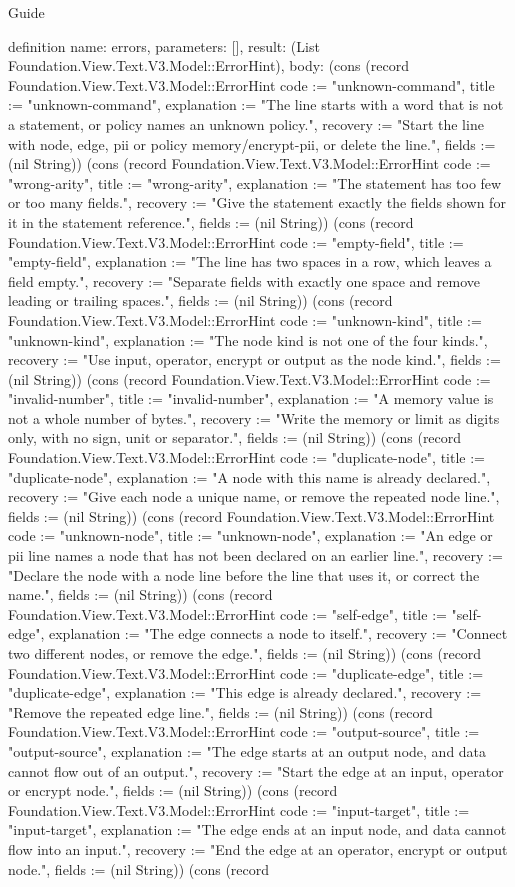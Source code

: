 \begin{lexlean}{Guide}
\begin{semanticmodule}
definition{
  name: errors,
  parameters: [],
  result: (List Foundation.View.Text.V3.Model::ErrorHint),
  body: (cons (record Foundation.View.Text.V3.Model::ErrorHint {code := "unknown-command", title := "unknown-command", explanation := "The line starts with a word that is not a statement, or policy names an unknown policy.", recovery := "Start the line with node, edge, pii or policy memory/encrypt-pii, or delete the line.", fields := (nil String)}) (cons (record Foundation.View.Text.V3.Model::ErrorHint {code := "wrong-arity", title := "wrong-arity", explanation := "The statement has too few or too many fields.", recovery := "Give the statement exactly the fields shown for it in the statement reference.", fields := (nil String)}) (cons (record Foundation.View.Text.V3.Model::ErrorHint {code := "empty-field", title := "empty-field", explanation := "The line has two spaces in a row, which leaves a field empty.", recovery := "Separate fields with exactly one space and remove leading or trailing spaces.", fields := (nil String)}) (cons (record Foundation.View.Text.V3.Model::ErrorHint {code := "unknown-kind", title := "unknown-kind", explanation := "The node kind is not one of the four kinds.", recovery := "Use input, operator, encrypt or output as the node kind.", fields := (nil String)}) (cons (record Foundation.View.Text.V3.Model::ErrorHint {code := "invalid-number", title := "invalid-number", explanation := "A memory value is not a whole number of bytes.", recovery := "Write the memory or limit as digits only, with no sign, unit or separator.", fields := (nil String)}) (cons (record Foundation.View.Text.V3.Model::ErrorHint {code := "duplicate-node", title := "duplicate-node", explanation := "A node with this name is already declared.", recovery := "Give each node a unique name, or remove the repeated node line.", fields := (nil String)}) (cons (record Foundation.View.Text.V3.Model::ErrorHint {code := "unknown-node", title := "unknown-node", explanation := "An edge or pii line names a node that has not been declared on an earlier line.", recovery := "Declare the node with a node line before the line that uses it, or correct the name.", fields := (nil String)}) (cons (record Foundation.View.Text.V3.Model::ErrorHint {code := "self-edge", title := "self-edge", explanation := "The edge connects a node to itself.", recovery := "Connect two different nodes, or remove the edge.", fields := (nil String)}) (cons (record Foundation.View.Text.V3.Model::ErrorHint {code := "duplicate-edge", title := "duplicate-edge", explanation := "This edge is already declared.", recovery := "Remove the repeated edge line.", fields := (nil String)}) (cons (record Foundation.View.Text.V3.Model::ErrorHint {code := "output-source", title := "output-source", explanation := "The edge starts at an output node, and data cannot flow out of an output.", recovery := "Start the edge at an input, operator or encrypt node.", fields := (nil String)}) (cons (record Foundation.View.Text.V3.Model::ErrorHint {code := "input-target", title := "input-target", explanation := "The edge ends at an input node, and data cannot flow into an input.", recovery := "End the edge at an operator, encrypt or output node.", fields := (nil String)}) (cons (record }
\end{semanticmodule}
\end{lexlean}
